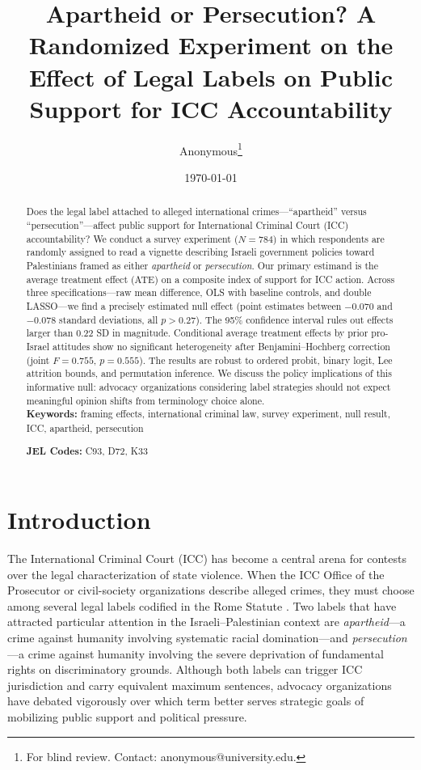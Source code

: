 \documentclass[12pt]{article}
\title{Apartheid or Persecution? A Randomized Experiment on the Effect of Legal Labels on Public Support for ICC Accountability}
\author{Anonymous\thanks{For blind review. Contact: anonymous@university.edu.}}
\date{\today}
\begin{document}
\maketitle

\begin{abstract}
\noindent
Does the legal label attached to alleged international crimes---``apartheid'' versus ``persecution''---affect public support for International Criminal Court (ICC) accountability? We conduct a survey experiment ($N = 784$) in which respondents are randomly assigned to read a vignette describing Israeli government policies toward Palestinians framed as either \emph{apartheid} or \emph{persecution}. Our primary estimand is the average treatment effect (ATE) on a composite index of support for ICC action. Across three specifications---raw mean difference, OLS with baseline controls, and double LASSO---we find a precisely estimated null effect (point estimates between $-0.070$ and $-0.078$ standard deviations, all $p > 0.27$). The 95\% confidence interval rules out effects larger than 0.22 SD in magnitude. Conditional average treatment effects by prior pro-Israel attitudes show no significant heterogeneity after Benjamini--Hochberg correction (joint $F = 0.755$, $p = 0.555$). The results are robust to ordered probit, binary logit, Lee attrition bounds, and permutation inference. We discuss the policy implications of this informative null: advocacy organizations considering label strategies should not expect meaningful opinion shifts from terminology choice alone. \\

\noindent\textbf{Keywords:} framing effects, international criminal law, survey experiment, null result, ICC, apartheid, persecution

\noindent\textbf{JEL Codes:} C93, D72, K33
\end{abstract}

\newpage

\section{Introduction}
\label{sec:intro}

The International Criminal Court (ICC) has become a central arena for contests over the legal characterization of state violence. When the ICC Office of the Prosecutor or civil-society organizations describe alleged crimes, they must choose among several legal labels codified in the Rome Statute \citep{icc2002rome}. Two labels that have attracted particular attention in the Israeli--Palestinian context are \emph{apartheid}---a crime against humanity involving systematic racial domination---and \emph{persecution}---a crime against humanity involving the severe deprivation of fundamental rights on discriminatory grounds. Although both labels can trigger ICC jurisdiction and carry equivalent maximum sentences, advocacy organizations have debated vigorously over which term better serves strategic goals of mobilizing public support and political pressure.
\end{document}
